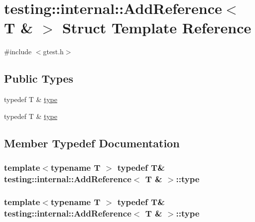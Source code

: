 \hypertarget{structtesting_1_1internal_1_1_add_reference_3_01_t_01_6_01_4}{\section{testing\-:\-:internal\-:\-:Add\-Reference$<$ T \& $>$ Struct Template Reference}
\label{structtesting_1_1internal_1_1_add_reference_3_01_t_01_6_01_4}
}


{\ttfamily \#include $<$gtest.\-h$>$}

\subsection*{Public Types}
\begin{DoxyCompactItemize}
\item 
typedef T \& \hyperlink{structtesting_1_1internal_1_1_add_reference_3_01_t_01_6_01_4_a93c064cdcdaced0abd167258425e57af}{type}
\item 
typedef T \& \hyperlink{structtesting_1_1internal_1_1_add_reference_3_01_t_01_6_01_4_a93c064cdcdaced0abd167258425e57af}{type}
\end{DoxyCompactItemize}


\subsection{Member Typedef Documentation}
\hypertarget{structtesting_1_1internal_1_1_add_reference_3_01_t_01_6_01_4_a93c064cdcdaced0abd167258425e57af}{
\subsubsection[{type}]{\setlength{\rightskip}{0pt plus 5cm}template$<$typename T $>$ typedef T\& {\bf testing\-::internal\-::\-Add\-Reference}$<$ T \& $>$\-::{\bf type}}}\label{structtesting_1_1internal_1_1_add_reference_3_01_t_01_6_01_4_a93c064cdcdaced0abd167258425e57af}
\hypertarget{structtesting_1_1internal_1_1_add_reference_3_01_t_01_6_01_4_a93c064cdcdaced0abd167258425e57af}{
\subsubsection[{type}]{\setlength{\rightskip}{0pt plus 5cm}template$<$typename T $>$ typedef T\& {\bf testing\-::internal\-::\-Add\-Reference}$<$ T \& $>$\-::{\bf type}}}\label{structtesting_1_1internal_1_1_add_reference_3_01_t_01_6_01_4_a93c064cdcdaced0abd167258425e57af}


